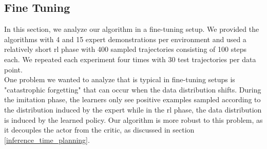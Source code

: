 \subsection{Fine Tuning}
\label{sec:fine_tuning}
In this section, we analyze our algorithm in a fine-tuning setup. We provided the algorithms with 4 and 15 expert demonstrations per 
environment and used a relatively short \ac{rl} phase with 400 sampled trajectories consisting of 100 steps each. We 
repeated each experiment four times with 30 test trajectories per data point.\\

One problem we wanted to analyze that is typical in fine-tuning setups 
is "catastrophic forgetting" 
that can occur when the data distribution shifts. During the imitation phase, the learners only see positive examples sampled according to 
the distribution induced by the expert while in the \ac{rl} phase, the data distribution is induced by the learned policy.
Our algorithm is more robust to this problem, as it 
decouples the actor from the critic, as discussed in section \ref{inference_time_planning}.\\ 

